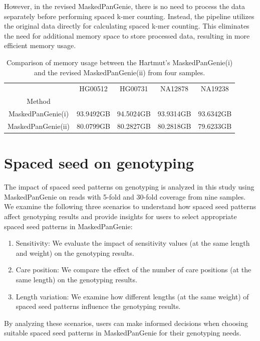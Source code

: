 \documentclass{PHlab-thesis}
\begin{document}
However, in the revised MaskedPanGenie, there is no need to process the data separately before performing spaced k-mer counting. Instead, the pipeline utilizes the original data directly for calculating spaced k-mer counting. This eliminates the need for additional memory space to store processed data, resulting in more efficient memory usage.

\begin{table}[ht!]
	\centering
	\begin{tabular*}{\textwidth}{@{\extracolsep{\fill}}ccccc@{\extracolsep{\fill}}}
        \toprule
         & HG00512 & HG00731 & NA12878 & NA19238 \\
         Method & & & & \\
        \midrule
        MaskedPanGenie(i)& 93.9492GB & 94.5024GB & 93.9314GB & 93.6342GB\\
        MaskedPanGenie(ii)& 80.0799GB & 80.2827GB & 80.2818GB & 79.6233GB\\
        \bottomrule 
	\end{tabular*}
	\caption{Comparison of memory usage between the Hartmut's MaskedPanGenie(i) and the revised MaskedPanGenie(ii) from four samples.}
	\label{table:Space_MaskedPanGenie}
\end{table}

\section{Spaced seed on genotyping}
The impact of spaced seed patterns on genotyping is analyzed in this study using MaskedPanGenie on reads with 5-fold and 30-fold coverage from nine samples. We examine the following three scenarios to understand how spaced seed patterns affect genotyping results and provide insights for users to select appropriate spaced seed patterns in MaskedPanGenie:
\begin{enumerate}
    \item Sensitivity: We evaluate the impact of sensitivity values (at the same length and weight) on the genotyping results.
    \item Care position: We compare the effect of the number of care positions (at the same length) on the genotyping results.
    \item Length variation: We examine how different lengths (at the same weight) of spaced seed patterns influence the genotyping results.
\end{enumerate}
By analyzing these scenarios, users can make informed decisions when choosing suitable spaced seed patterns in MaskedPanGenie for their genotyping needs.
\end{document}
